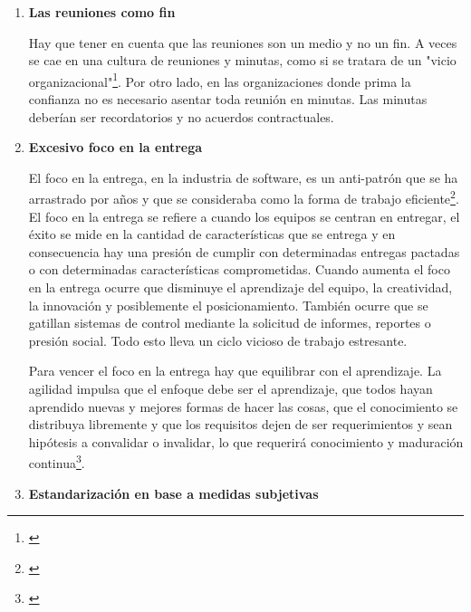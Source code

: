 \begin{enumerate}
\item \textbf{Las reuniones como fin}

Hay que tener en cuenta que las reuniones son un medio y no un fin. A veces se cae en una cultura de reuniones y minutas, como si se tratara de un "vicio organizacional"\footnote{\cite{UNTREF-2014}}. Por otro lado, en las organizaciones donde prima la confianza no es necesario asentar toda reunión en minutas. Las minutas deberían ser recordatorios y no acuerdos contractuales.

\item \textbf{Excesivo foco en la entrega}

El foco en la entrega, en la industria de software, es un anti-patrón que se ha arrastrado por años y que se consideraba como la forma de trabajo eficiente\footnote{\cite{Erich-Buhler-2015}}. El foco en la entrega se refiere a cuando los equipos se centran en entregar, el éxito se mide en la cantidad de características que se entrega y en consecuencia hay una presión de cumplir con determinadas entregas pactadas o con determinadas características comprometidas. Cuando aumenta el foco en la entrega ocurre que disminuye el aprendizaje del equipo, la creatividad, la innovación y posiblemente el posicionamiento. También ocurre que se gatillan sistemas de control mediante la solicitud de informes, reportes o presión social. Todo esto lleva un ciclo vicioso de trabajo estresante.

Para vencer el foco en la entrega hay que equilibrar con el aprendizaje. La agilidad impulsa que el enfoque debe ser el aprendizaje, que todos hayan aprendido nuevas y mejores formas de hacer las cosas, que el conocimiento se distribuya libremente y que los requisitos dejen de ser requerimientos y sean hipótesis a convalidar o invalidar, lo que requerirá conocimiento y maduración continua\footnote{\cite{Erich-Buhler-2015}}.

\item \textbf{Estandarización en base a medidas subjetivas}


\end{enumerate}
